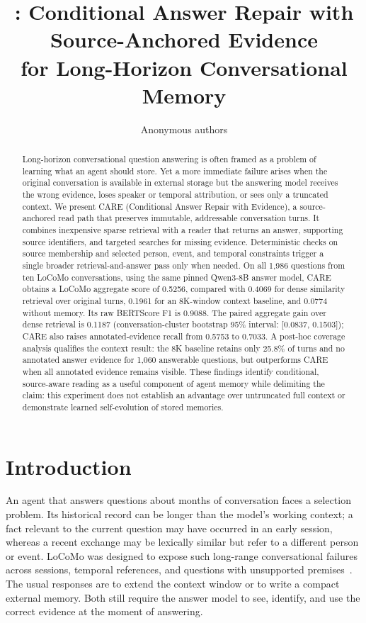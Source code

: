 \documentclass[11pt]{article}
\title{\care: Conditional Answer Repair with Source-Anchored Evidence\\
for Long-Horizon Conversational Memory}
\author{Anonymous authors}
\date{}
\newcommand{\care}{\textsc{CARE}}
\begin{document}
\maketitle

\begin{abstract}
Long-horizon conversational question answering is often framed as a problem
of learning what an agent should store. Yet a more immediate failure arises
when the original conversation is available in external storage but the
answering model receives the wrong evidence, loses speaker or temporal
attribution, or sees only a truncated context. We present \care{} (Conditional
Answer Repair with Evidence), a source-anchored read path that preserves
immutable, addressable conversation turns. It combines inexpensive sparse
retrieval with a reader that returns an answer, supporting source identifiers,
and targeted searches for missing evidence. Deterministic checks on source
membership and selected person, event, and temporal constraints trigger a
single broader retrieval-and-answer pass only when needed. On all 1,986
questions from ten LoCoMo conversations, using the same pinned Qwen3-8B
answer model, \care{} obtains a LoCoMo aggregate score of 0.5256, compared
with 0.4069 for dense similarity retrieval over original turns, 0.1961 for
an 8K-window context baseline, and 0.0774 without memory. Its raw
BERTScore F1 is 0.9088. The paired aggregate gain over dense retrieval is
0.1187 (conversation-cluster bootstrap 95\% interval: [0.0837, 0.1503]);
\care{} also raises annotated-evidence recall from 0.5753 to 0.7033.
A post-hoc coverage analysis qualifies the context result: the 8K baseline
retains only 25.8\% of turns and no annotated answer evidence for 1,060
answerable questions, but outperforms \care{} when all annotated evidence
remains visible. These findings identify conditional, source-aware reading
as a useful component of agent memory while delimiting the claim: this
experiment does not establish an advantage over untruncated full context
or demonstrate learned self-evolution of stored memories.
\end{abstract}

\section{Introduction}
\label{sec:introduction}

An agent that answers questions about months of conversation faces a
selection problem. Its historical record can be longer than the model's
working context; a fact relevant to the current question may have occurred
in an early session, whereas a recent exchange may be lexically similar but
refer to a different person or event. LoCoMo was designed to expose such
long-range conversational failures across sessions, temporal references,
and questions with unsupported premises~\cite{maharana2024locomo}. The
usual responses are to extend the context window or to write a compact
external memory. Both still require the answer model to see, identify, and
use the correct evidence at the moment of answering.
\end{document}
